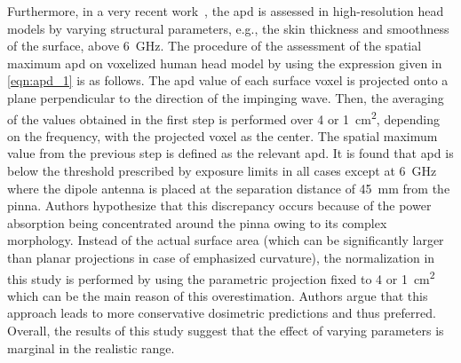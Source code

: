 Furthermore, in a very recent work~\cite{Taguchi2022Computation}, the \gls{apd} is assessed in high-resolution head models by varying structural parameters, e.g., the skin thickness and smoothness of the surface, above \SI{6}{\GHz}.
The procedure of the assessment of the spatial maximum \gls{apd} on voxelized human head model by using the expression given in \cref{eqn:apd_1} is as follows.
The \gls{apd} value of each surface voxel is projected onto a plane perpendicular to the direction of the impinging wave.
Then, the averaging of the values obtained in the first step is performed over \SI{4}{} or \SI{1}{\cm\squared}, depending on the frequency, with the projected voxel as the center.
The spatial maximum value from the previous step is defined as the relevant \gls{apd}.
It is found that \gls{apd} is below the threshold prescribed by exposure limits in all cases except at \SI{6}{GHz} where the dipole antenna is placed at the separation distance of \SI{45}{\mm} from the pinna.
Authors hypothesize that this discrepancy occurs because of the power absorption being concentrated around the pinna owing to its complex morphology.
Instead of the actual surface area (which can be significantly larger than planar projections in case of emphasized curvature), the normalization in this study is performed by using the parametric projection fixed to \SI{4}{} or \SI{1}{\cm\squared} which can be the main reason of this overestimation.
Authors argue that this approach leads to more conservative dosimetric predictions and thus preferred.
Overall, the results of this study suggest that the effect of varying parameters is marginal in the realistic range.

